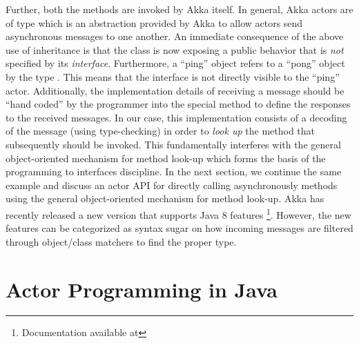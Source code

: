 Further, both the  methods are invoked by Akka  itself. 
In general, Akka actors are of type   which is an abstraction provided by Akka to allow actors send asynchronous messages to one another.
% 
An immediate consequence  of the above use of inheritance is that the class  is now exposing a public behavior 
that is \emph{not} specified by its \emph{interface}. 
Furthermore, a ``ping'' object refers to a ``pong'' object by the type  .
This means that the interface  is not directly visible to the ``ping'' actor.
Additionally, the implementation details of receiving a message should be 
``hand coded'' by the programmer into the  special method  to define the  responses to the received messages.
In our case, this implementation consists of a decoding of the message  (using type-checking)
in order to \emph{look up} the method that subsequently should be invoked.
This fundamentally interferes with the general object-oriented mechanism for method look-up which forms the basis of the programming to interfaces discipline.
In the next section, we continue the same example and discuss an actor API for directly calling asynchronously methods
using the general object-oriented mechanism for method look-up.
Akka has recently released a new version that supports Java 8 features
\footnote{Documentation available at }.
However, the new features can be categorized as syntax sugar on how incoming messages are filtered through object/class matchers to find the proper type.

\section{Actor Programming in Java}
\label{sec:actor:programming}

